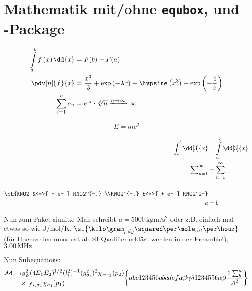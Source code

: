 \chapter{Mathematik mit/ohne \texttt{equbox}, und \texorpdfstring{}{chemformula}-Package}
\label{chap:Mathematik}
\begin{align}
\int\limits_{a}^{b} f \left( x \right) \dd{x} &= F(b) - F(a) \\
\pdv[n]{f}{x} &= \dfrac{x^{3}}{3} + \exp \left( -\lambda x \right) + \hypsine \left( x^{3} \right) + \exp \left( - \frac{\mathrm{i}}{x} \right) \notag\\
\sum\limits_{i=1}^{n} a_{n} &= e^{\mathrm{i} \pi } \cdot \sqrt[3]{n}  \xrightarrow{n \to \infty} \infty 
\end{align}
\begin{equbox}
	\begin{align}
	E=mc^2\label{equ:Mathematik:E = mc2}
	\end{align}%
\end{equbox}%
\begin{equbox}
	\allowdisplaybreaks%
	\begin{align}%
	\int\nolimits_a^b \dd[3]{x} &= \int\limits_a^b \dd[3]{x}\\%
	\sum\nolimits_{n=1}^{\infty} &= \sum_{n=1}^\infty\\%
	\label{equ:Mathematik:Formel} \\%
	\ch{%
		RNO2 &<=>[ + e- ] RNO2^{-.} \\%
		RNO2^{-.} &<=>[ + e- ] RNO2^2-%
	} \\%
	a&=b
	\end{align}%
\end{equbox}%
Nun zum Paket siunitx: Man schreibt $a=\SI{5000}{\kilo\gram\metre\per\square\second}$ oder z.B. einfach mal etwas so wie $\si{\joule\per\mole\per\kelvin}$, $\si{\kilo\gram_{poly}\squared\per\mole_{cat}\per\hour}$ (für Hochzahlen muss cat als SI-Qualifier erklärt werden in der Preamble!), $\SI{3.00}{\MHz}$%
\begin{center}%
%
\end{center}%
Nun Subequations:%
\begin{subequations}%
	\label{equ:Mathematik:sub-gesamt}%
	\begin{align}%
	{\cal M}=&ig_Z^2(4E_1E_2)^{1/2}(l_i^2)^{-1}
	(g_{\sigma_2}^e)^2\chi_{-\sigma_2}(p_2)\nonumber\\
	&\times
	[\epsilon_i]_{\sigma_1}\chi_{\sigma_1}(p_1)
	\label{subequ:Mathematik:sub-a}
	\end{align}%
	\begin{gather}%
	\left\{
	abc123456abcdef\alpha\beta\gamma\delta 1234556\alpha\beta
	\frac{1\sum^{a}_{b}}{A^2}
	\right\}
	\label{subequ:Mathematik:sub-b}
	\end{gather}%
\end{subequations}%
